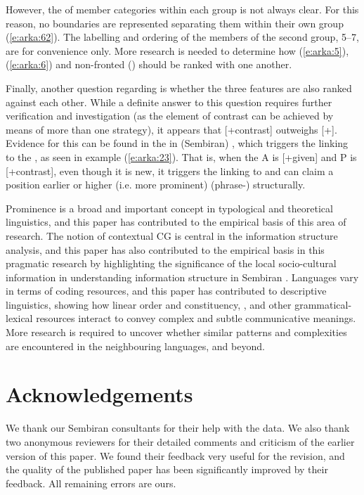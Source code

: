 \documentclass[output=paper
,modfonts
,nonflat]{langsci/langscibook}
\begin{document}
However, the  of member categories within each group is not always clear. For this reason, no boundaries are represented separating them within their own group (\ref{e:arka:62}). The labelling and ordering of the members of the second group, 5--7, are for convenience only. More research is needed to determine how  (\ref{e:arka:5}),  (\ref{e:arka:6}) and non-fronted ()  should be ranked with one another.

Finally, another question regarding  is whether the three features are also ranked against each other. While a definite answer to this question requires further verification and investigation (as the element of contrast can be achieved by means of more than one strategy), it appears that [+contrast] outweighs [+]. Evidence for this can be found in the   in (Sembiran) , which triggers the linking to the , as seen in example (\ref{e:arka:23}). That is, when the A is [+given] and P is [+contrast], even though it is new, it triggers the linking to  and can claim a position earlier or higher (i.e. more prominent) (phrase-) structurally. 

Prominence is a broad and important concept in typological and theoretical linguistics, and this paper has contributed to the empirical basis of this area of research. The notion of contextual CG is central in the information structure analysis, and this paper has also contributed to the empirical basis in this  pragmatic research by highlighting the significance of the local socio-cultural information in understanding information structure in Sembiran . Languages vary in terms of coding resources, and this paper has contributed to descriptive linguistics, showing how linear order and constituency, , and other grammatical-lexical resources interact to convey complex and subtle communicative meanings. More research is required to uncover whether similar patterns and complexities are encountered in the neighbouring languages, and beyond.\largerpage[2]

\section*{Acknowledgements}

We thank our Sembiran  consultants for their help with the data. We also thank two anonymous reviewers for their detailed comments and criticism of the earlier version of this paper. We found their feedback very useful for the revision, and the quality of the published paper has been significantly improved by their feedback. All remaining errors are ours.
  
\end{document}
